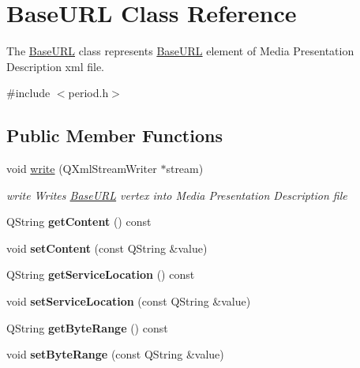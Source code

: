 \hypertarget{class_base_u_r_l}{\section{Base\-U\-R\-L Class Reference}
\label{class_base_u_r_l}
}


The \hyperlink{class_base_u_r_l}{Base\-U\-R\-L} class represents \hyperlink{class_base_u_r_l}{Base\-U\-R\-L} element of Media Presentation Description xml file.  




{\ttfamily \#include $<$period.\-h$>$}

\subsection*{Public Member Functions}
\begin{DoxyCompactItemize}
\item 
void \hyperlink{class_base_u_r_l_add8c1d17fc01a655570c868e46003efd}{write} (Q\-Xml\-Stream\-Writer $\ast$stream)
\begin{DoxyCompactList}\small\item\em write Writes \hyperlink{class_base_u_r_l}{Base\-U\-R\-L} vertex into Media Presentation Description file \end{DoxyCompactList}\item 
\hypertarget{class_base_u_r_l_ad6a11a51adabbf5f0e9cdf84787dd26f}{Q\-String {\bfseries get\-Content} () const }\label{class_base_u_r_l_ad6a11a51adabbf5f0e9cdf84787dd26f}

\item 
\hypertarget{class_base_u_r_l_a666c75d5eb8e1e948e3b92659358abfd}{void {\bfseries set\-Content} (const Q\-String \&value)}\label{class_base_u_r_l_a666c75d5eb8e1e948e3b92659358abfd}

\item 
\hypertarget{class_base_u_r_l_a0f20b8c1d3b03afd0c4ba5ab0fc26024}{Q\-String {\bfseries get\-Service\-Location} () const }\label{class_base_u_r_l_a0f20b8c1d3b03afd0c4ba5ab0fc26024}

\item 
\hypertarget{class_base_u_r_l_a1963c314bf41a6bf97d1adadecf33038}{void {\bfseries set\-Service\-Location} (const Q\-String \&value)}\label{class_base_u_r_l_a1963c314bf41a6bf97d1adadecf33038}

\item 
\hypertarget{class_base_u_r_l_ac246605fe1c4f35b1c73e345844bbb91}{Q\-String {\bfseries get\-Byte\-Range} () const }\label{class_base_u_r_l_ac246605fe1c4f35b1c73e345844bbb91}

\item 
\hypertarget{class_base_u_r_l_af44c979068c618592c73d68cd9d1fc1e}{void {\bfseries set\-Byte\-Range} (const Q\-String \&value)}\label{class_base_u_r_l_af44c979068c618592c73d68cd9d1fc1e}

\end{DoxyCompactItemize}


